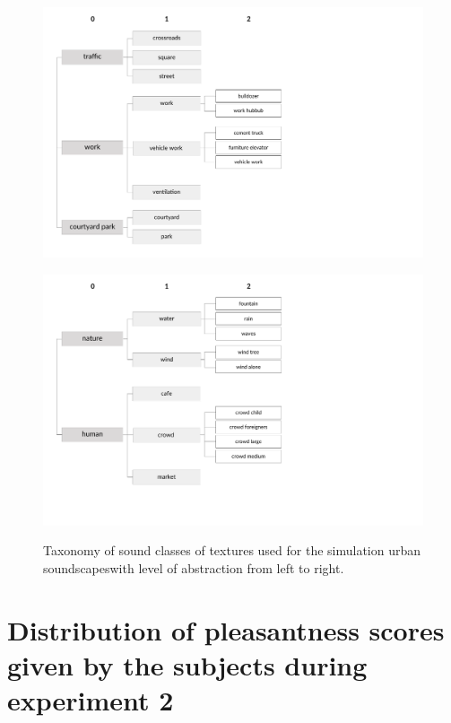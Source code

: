 \documentclass[12pt]{elsarticle}
\providecommand{\DIFadd}[1]{{\protect\color{blue}\uwave{#1}}} %
\providecommand{\DIFaddFL}[1]{\DIFadd{#1}} %
\providecommand{\DIFaddbeginFL}{} %
\providecommand{\DIFaddendFL}{} %
\begin{document}
\begin{figure}[hp]
  \centering
        {\includegraphics[trim={ 0 0 7cm 0},clip,width=.7\columnwidth]{gfx/appendix/texture_1_en}\label{fig:taxonomieTexturea}} \par

        {\includegraphics[trim={ 0 0 7cm 1cm},clip,width=.7\columnwidth]{gfx/appendix/texture_2_en}\label{fig:taxonomieTextureb}}
       \caption{Taxonomy of sound classes of textures used for the simulation \DIFaddbeginFL \DIFaddFL{of }\DIFaddendFL urban soundscapes\DIFaddbeginFL \DIFaddFL{, }\DIFaddendFL with level of abstraction from left to right.}
       \label{fig:taxonomieT}
\end{figure}

\newpage
\section{Distribution of pleasantness scores given by the subjects during experiment 2}
\label{app:xp2}
\end{document}
